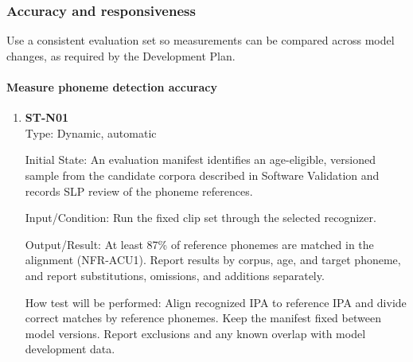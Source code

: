\documentclass[12pt, titlepage]{article}
\newcommand{\PhonemeAccuracyTarget}{87\%}
\begin{document}
\subsubsection{Accuracy and responsiveness}

Use a consistent evaluation set so measurements can be compared across
model changes, as required by the Development Plan.

\paragraph{Measure phoneme detection accuracy}
\begin{enumerate}
    \item \textbf{ST-N01}\\

    Type: Dynamic, automatic

    Initial State: An evaluation manifest identifies an age-eligible, versioned sample from the candidate corpora described in Software Validation and records SLP review of the phoneme references.

    Input/Condition: Run the fixed clip set through the selected recognizer.

    Output/Result: At least \PhonemeAccuracyTarget{} of reference phonemes are matched in the alignment (NFR-ACU1). Report results by corpus, age, and target phoneme, and report substitutions, omissions, and additions separately.

    How test will be performed: Align recognized IPA to reference IPA and divide correct matches by reference phonemes. Keep the manifest fixed between model versions. Report exclusions and any known overlap with model development data.

\end{enumerate}
\end{document}
